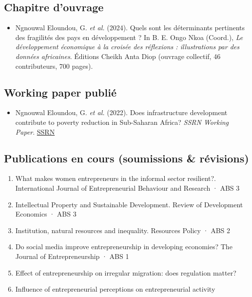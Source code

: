 \documentclass[
  french,
  10pt,
  letterpaper,
  DIV=11,
  numbers=noendperiod]{scrartcl}
\providecommand{\tightlist}{%
  \setlength{\itemsep}{0pt}\setlength{\parskip}{0pt}}
\begin{document}
\subsection{Chapitre d'ouvrage}\label{chapitre-douvrage}

\begin{itemize}
\tightlist
\item
  Ngnouwal Eloundou, G. \textit{et al.} (2024). Quels sont les
  déterminants pertinents des fragilités des pays en développement ? In
  B. E. Ongo Nkoa (Coord.),
  \textit{Le développement économique à la croisée des réflexions : illustrations par des données africaines}.
  Éditions Cheikh Anta Diop (ouvrage collectif, 46 contributeurs, 700
  pages).
\end{itemize}

\subsection{Working paper publié}\label{working-paper-publiuxe9}

\begin{itemize}
\tightlist
\item
  Ngnouwal Eloundou, G. \textit{et al.} (2022). Does infrastructure
  development contribute to poverty reduction in Sub-Saharan Africa?
  \textit{SSRN Working Paper}.
  \href{https://ssrn.com/abstract=4397985}{SSRN}
\end{itemize}

\subsection{Publications en cours (soumissions \&
révisions)}\label{publications-en-cours-soumissions-ruxe9visions}

\begin{enumerate}[leftmargin=1.6em, itemsep=2pt]
\item What makes women entrepreneurs in the informal sector resilient?. International Journal of Entrepreneurial Behaviour and Research · ABS 3
\item Intellectual Property and Sustainable Development. Review of Development Economics · ABS 3
\item Institution, natural resources and inequality. Resources Policy · ABS 2
\item Do social media improve entrepreneurship in developing economies? The Journal of Entrepreneurship · ABS 1
\item Effect of entrepreneurship on irregular migration: does regulation matter?
\item Influence of entrepreneurial perceptions on entrepreneurial activity
\end{enumerate}
\end{document}
